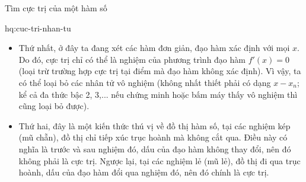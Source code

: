 \begin{lythuyetbox}{Tìm cực trị của một hàm số}
\begin{banchat}{}{hq:cuc-tri-nhan-tu}
\begin{itemize}
    \item Thứ nhất, ở đây ta đang xét các hàm đơn giản, đạo hàm xác định với mọi $x$. Do đó, cực trị chỉ có thể là nghiệm của phương trình đạo hàm $f'(x) = 0$ (loại trừ trường hợp cực trị tại điểm mà đạo hàm không xác định). Vì vậy, ta có thể loại bỏ các nhân tử vô nghiệm (không nhất thiết phải có dạng $x-x_n$; kể cả đa thức bậc 2, 3,... nếu chứng minh hoặc bấm máy thấy vô nghiệm thì cũng loại bỏ được).
    \item Thứ hai, đây là một kiến thức thú vị về đồ thị hàm số, tại các nghiệm kép (mũ chẵn), đồ thị chỉ tiếp xúc trục hoành mà không cắt qua. Điều này có nghĩa là trước và sau nghiệm đó, dấu của đạo hàm không thay đổi, nên đó không phải là cực trị. Ngược lại, tại các nghiệm lẻ (mũ lẻ), đồ thị đi qua trục hoành, dấu của đạo hàm đổi qua nghiệm đó, nên đó chính là cực trị.
\end{itemize}
\begin{center}
\end{center}
\end{banchat}

\end{lythuyetbox}

